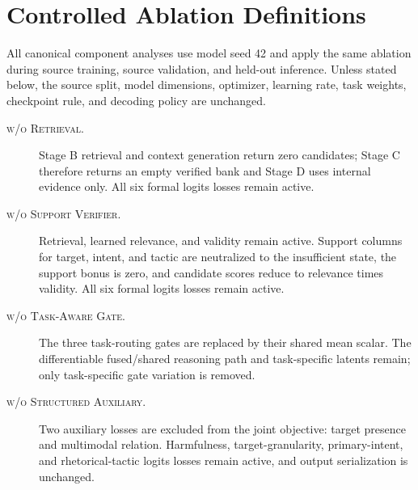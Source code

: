 \section{Controlled Ablation Definitions}
\label{sec:supp:ablations}

All canonical component analyses use model seed 42 and apply the same
ablation during source training, source validation, and held-out inference.
Unless stated below, the source split, model dimensions, optimizer, learning
rate, task weights, checkpoint rule, and decoding policy are unchanged.

\begin{description}
  \item[\textsc{w/o Retrieval}.]
  Stage B retrieval and context generation return zero candidates; Stage C
  therefore returns an empty verified bank and Stage D uses internal evidence
  only.  All six formal logits losses remain active.

  \item[\textsc{w/o Support Verifier}.]
  Retrieval, learned relevance, and validity remain active.  Support columns
  for target, intent, and tactic are neutralized to the insufficient state, the
  support bonus is zero, and candidate scores reduce to relevance times
  validity.  All six formal logits losses remain active.

  \item[\textsc{w/o Task-Aware Gate}.]
  The three task-routing gates are replaced by their shared mean scalar.  The
  differentiable fused/shared reasoning path and task-specific latents remain;
  only task-specific gate variation is removed.

  \item[\textsc{w/o Structured Auxiliary}.]
  Two auxiliary losses are excluded from the joint objective: target presence
  and multimodal relation.  Harmfulness, target-granularity, primary-intent, and
  rhetorical-tactic logits losses remain active, and output serialization is
  unchanged.
\end{description}
